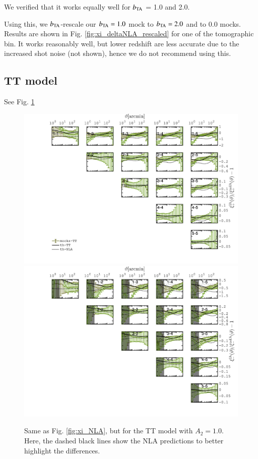\documentclass[useAMS,usenatbib]{mn2e}
\begin{document}
We verified that it works equally well for $b_{\rm TA}$ = 1.0 and 2.0.


Using this, we $b_{\rm TA}$-rescale our $b_{\rm TA}=1.0$ mock to $b_{\rm TA}=2.0$ and to $0.0$ mocks. Results are shown in Fig. \ref{fig:xi_deltaNLA_rescaled} for one of the tomographic bin. It works reasonably well, but lower redshift are less accurate due to the increased  shot noise (not shown), hence we do not recommend using this.

\subsection{TT model}
\label{subsec:TT}

See Fig. \ref{fig:xi_TT}

\begin{figure}
\includegraphics[width=\columnwidth]{graphs/frac_xip_IA1_skysim_TT_srd.jpg}
\includegraphics[width=\columnwidth]{graphs/frac_xim_IA1_skysim_TT_srd.jpg}
\caption{Same as Fig. \ref{fig:xi_NLA}, but for the TT model with $A_2=1.0$. Here, the dashed black lines show the NLA predictions to better highlight the differences. }
\label{fig:xi_TT}
\end{figure}
\end{document}
